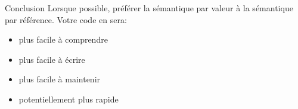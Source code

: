 \documentclass[french]{beamer}
\begin{document}
\begin{frame}{Conclusion}
    Lorsque possible, préférer la sémantique par valeur à la sémantique par référence. Votre code en sera:
    \begin{itemize}
        \item plus facile à comprendre
        \item plus facile à écrire
        \item plus facile à maintenir
        \item potentiellement plus rapide
    \end{itemize}
\end{frame}
\end{document}
